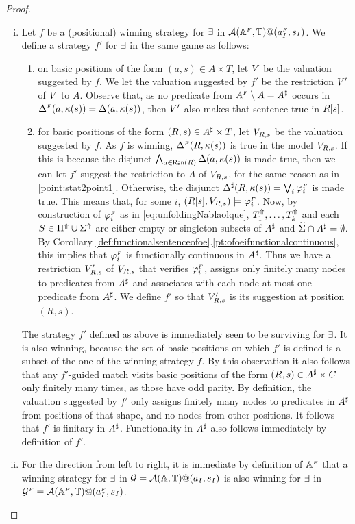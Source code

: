 \begin{proof}
\begin{enumerate}[(i)]
\item  
Let $f$ be a (positional) winning strategy for $\exists$ in $\mathcal{A}
(\mathbb{A}^{{\scriptscriptstyle F}},\mathbb{T})@(a_I^{{\scriptscriptstyle F}},s_I)$.
We define a strategy $f'$ for $\exists$ in the same game as follows:
\begin{enumerate}[label=(\alph*),ref=\alph*]
\item on basic positions of the form $(a,s) \in A\times T$, let $V$ be the 
  valuation suggested by $f$. 
  We let the valuation suggested by $f'$ be the restriction $V'$ of $V$ 
  to $A$. 
  Observe that, as no predicate from $A^{{\scriptscriptstyle F}}\setminus A =A^{\sharp}$ occurs in 
  $\Delta^{{\scriptscriptstyle F}}(a,\kappa(s)) = \Delta(a,\kappa(s))$, then $V'$ also makes that 
  sentence true in $R[s]$.
  \label{point:stat2point1}
\item for basic positions of the form $(R,s) \in A^{\sharp} \times T$, let $V_{R,s}$
  be the valuation suggested by $f$. 
  As $f$ is winning, $\Delta^{{\scriptscriptstyle F}}(R,\kappa(s))$ is true in the model $V_{R,s}$. 
  If this is because the disjunct $\bigwedge_{a \in \mathsf{Ran}(R)} \Delta(a,\kappa(s))$ is 
  made true, then we can let $f'$ suggest the restriction to $A$ of $V_{R,s}$,
  for the same reason as in \eqref{point:stat2point1}. 
  Otherwise, the disjunct $\Delta^{\sharp}(R,\kappa(s)) = \bigvee_{i}\varphi_i^{{\scriptscriptstyle F}}$ is made 
  true. 
  This means that, for some $i$, $(R[s], V_{R,s}) \models \varphi_i^{{\scriptscriptstyle F}}$.
  Now, by construction of $\varphi_i^{{\scriptscriptstyle F}}$ as in \eqref{eq:unfoldingNablaolque},
  $T^{\Uparrow}_1,\dots,T^{\Uparrow}_k$ and each $S \in \Pi^{\Uparrow} \cup \Sigma^{\Uparrow}$ 
  are either empty or singleton subsets of $A^{\sharp}$ and $\widetilde{\Sigma} \cap 
  A^{\sharp} = \emptyset$. 
  By Corollary \ref{def:functionalsentenceofoe}.\ref{pt:ofoeifunctionalcontinuous}, 
  this implies that $\varphi_i^{{\scriptscriptstyle F}}$ is functionally continuous in $A^{\sharp}$. 
  Thus we have a restriction $V_{R,s}'$ of $V_{R,s}$ that verifies 
  $\varphi_i^{{\scriptscriptstyle F}}$, assigns only finitely many nodes to predicates from $A^{\sharp}$
  and associates with each node at most one predicate from $A^{\sharp}$. 
  We define $f'$ so that $V_{R,s}'$ is its suggestion at position $(R,s)$.
\end{enumerate}
The strategy $f'$ defined as above is immediately seen to be surviving for 
$\exists$. It is also winning, because the set of basic positions on which $f'$ 
is defined is a subset of the one of the winning strategy $f$. 
By this observation it also follows that any $f'$-guided match visits basic 
positions of the form $(R,s) \in A^{\sharp} \times C$ only finitely many times, as 
those have odd parity. 
By definition, the valuation suggested by $f'$ only assigns finitely many nodes 
to predicates in $A^{\sharp}$ from positions of that shape, and no nodes from other 
positions. It follows that $f'$ is finitary in $A^{\sharp}$. Functionality in $A^{\sharp}$ also follows immediately by definition of $f'$.
  \item For the direction from left to right, it is immediate by definition of $\mathbb{A}^{{\scriptscriptstyle F}}$ that a winning strategy for $\exists$ in $\mathcal{G} = \mathcal{A}(\mathbb{A},\mathbb{T})@(a_I,s_I)$ is also winning for $\exists$ in $\mathcal{G}^{{\scriptscriptstyle F}} = \mathcal{A}(\mathbb{A}^{{\scriptscriptstyle F}},\mathbb{T})@(a_I^{{\scriptscriptstyle F}},s_I)$.


\end{enumerate}
\end{proof}
